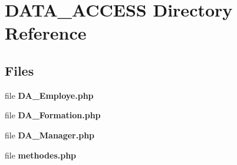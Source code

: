 \section{D\+A\+T\+A\+\_\+\+A\+C\+C\+E\+SS Directory Reference}
\label{dir_6849eec6b3a033d3ac4bbdbfc7a7b725}
\subsection*{Files}
\begin{DoxyCompactItemize}
\item 
file \textbf{ D\+A\+\_\+\+Employe.\+php}
\item 
file \textbf{ D\+A\+\_\+\+Formation.\+php}
\item 
file \textbf{ D\+A\+\_\+\+Manager.\+php}
\item 
file \textbf{ methodes.\+php}
\end{DoxyCompactItemize}
